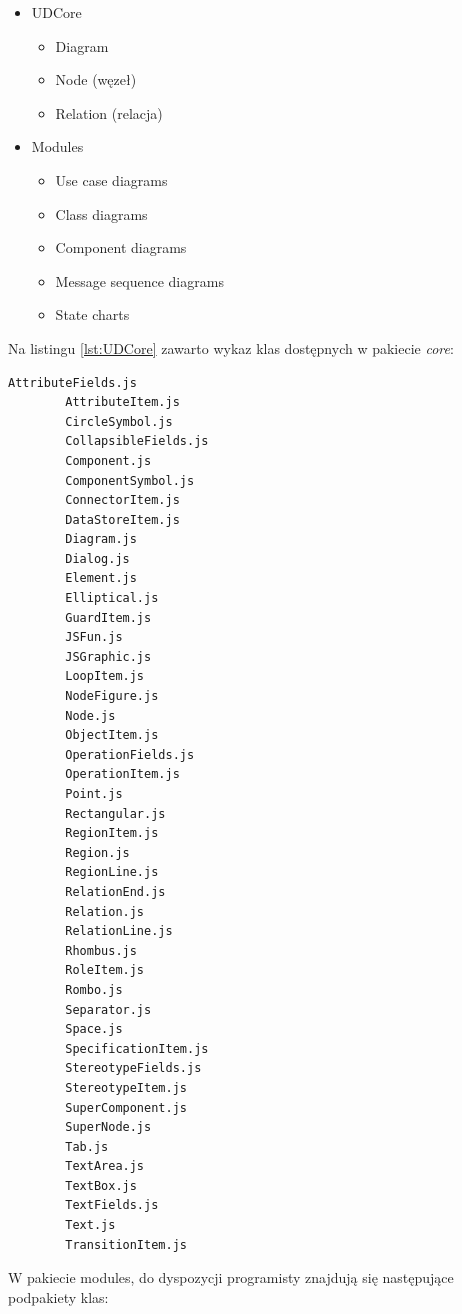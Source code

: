         \begin{itemize}
          \item UDCore
            \begin{itemize}
              \item Diagram
              \item Node (węzeł)
              \item Relation (relacja)
            \end{itemize}
          \item Modules 
            \begin{itemize}
              \item Use case diagrams
              \item Class diagrams
              \item Component diagrams
              \item Message sequence diagrams
              \item State charts
            \end{itemize}
        \end{itemize}

        Na listingu \ref{lst:UDCore} zawarto wykaz klas dostępnych w pakiecie \emph{core}:

        \begin{lstlisting}[caption={klasy bazowe jsUML2}, label={lst:UDCore}]
        AttributeFields.js
        AttributeItem.js
        CircleSymbol.js
        CollapsibleFields.js
        Component.js
        ComponentSymbol.js
        ConnectorItem.js
        DataStoreItem.js
        Diagram.js
        Dialog.js
        Element.js
        Elliptical.js
        GuardItem.js
        JSFun.js
        JSGraphic.js
        LoopItem.js
        NodeFigure.js
        Node.js
        ObjectItem.js
        OperationFields.js
        OperationItem.js
        Point.js
        Rectangular.js
        RegionItem.js
        Region.js
        RegionLine.js
        RelationEnd.js
        Relation.js
        RelationLine.js
        Rhombus.js
        RoleItem.js
        Rombo.js
        Separator.js
        Space.js
        SpecificationItem.js
        StereotypeFields.js
        StereotypeItem.js
        SuperComponent.js
        SuperNode.js
        Tab.js
        TextArea.js
        TextBox.js
        TextFields.js
        Text.js
        TransitionItem.js
        \end{lstlisting}

        W pakiecie modules, do dyspozycji programisty znajdują się następujące podpakiety klas:

